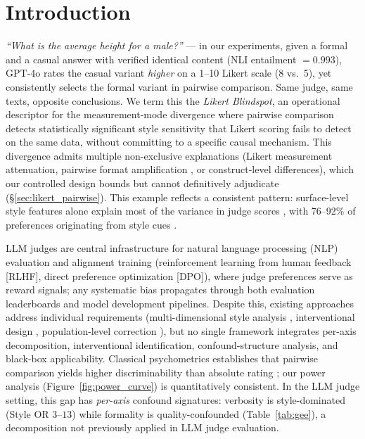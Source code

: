 \section{Introduction}

\emph{``What is the average height for a male?''} --- in our experiments, given a formal and a casual answer with verified identical content (NLI entailment $= 0.993$), GPT-4o rates the casual variant \emph{higher} on a 1--10 Likert scale (8 vs.\ 5), yet consistently selects the formal variant in pairwise comparison.
Same judge, same texts, opposite conclusions.
We term this the \emph{Likert Blindspot}, an operational descriptor for the measurement-mode divergence where pairwise comparison detects statistically significant style sensitivity that Likert scoring fails to detect on the same data, without committing to a specific causal mechanism.
This divergence admits multiple non-exclusive explanations (Likert measurement attenuation, pairwise format amplification \citep{jeong2025comparative}, or construct-level differences), which our controlled design bounds but cannot definitively adjudicate (\S\ref{sec:likert_pairwise}).
This example reflects a consistent pattern: surface-level style features alone explain most of the variance in judge scores \citep{murugadoss2025sos}, with 76--92\% of preferences originating from style cues \citep{li2026preference,soumik2026judging}.

LLM judges are central infrastructure for natural language processing (NLP) evaluation and alignment training (reinforcement learning from human feedback [RLHF], direct preference optimization [DPO]), where judge preferences serve as reward signals; any systematic bias propagates through both evaluation leaderboards and model development pipelines.
Despite this, existing approaches address individual requirements (multi-dimensional style analysis \citep{casse2026concise,wang2026fairjudge}, interventional design \citep{reber2025rate}, population-level correction \citep{dubois2025lc}), but no single framework integrates per-axis decomposition, interventional identification, confound-structure analysis, and black-box applicability.
Classical psychometrics establishes that pairwise comparison yields higher discriminability than absolute rating \citep{thurstone1927law,david1988method}; our power analysis (Figure~\ref{fig:power_curve}) is quantitatively consistent.
In the LLM judge setting, this gap has \emph{per-axis} confound signatures: verbosity is style-dominated (Style OR $3$--$13$) while formality is quality-confounded (Table~\ref{tab:gee}), a decomposition not previously applied in LLM judge evaluation.

